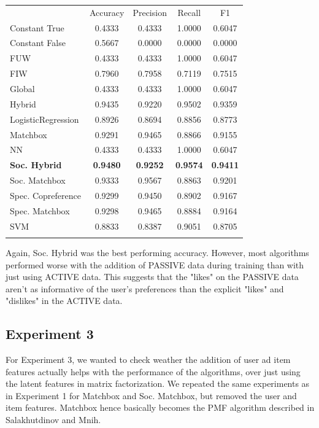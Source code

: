 \begin{table}
\begin{tabular}{ l  c  c  c  c }
\hline\noalign{\smallskip}
 & Accuracy & Precision & Recall & F1 \\
  \noalign{\smallskip}\hline\noalign{\smallskip}
 Constant True & 0.4333  & 0.4333 & 1.0000 & 0.6047 \\
 Constant False & 0.5667 & 0.0000 & 0.0000 & 0.0000 \\
FUW &  0.4333 & 0.4333  & 1.0000 & 0.6047 \\
FIW & 0.7960  & 0.7958 & 0.7119  & 0.7515  \\
Global & 0.4333  & 0.4333  & 1.0000 & 0.6047 \\
Hybrid & 0.9435 & 0.9220  & 0.9502 & 0.9359 \\
LogisticRegression & 0.8926 & 0.8694 & 0.8856 & 0.8773 \\
Matchbox & 0.9291  & 0.9465 & 0.8866  & 0.9155 \\
NN & 0.4333 & 0.4333  & 1.0000 & 0.6047 \\
{\bf Soc. Hybrid} & {\bf 0.9480} & {\bf 0.9252}  & {\bf 0.9574}  & {\bf 0.9411} \\
Soc. Matchbox & 0.9333 & 0.9567  & 0.8863  & 0.9201 \\
Spec. Copreference & 0.9299 & 0.9450 & 0.8902  & 0.9167  \\
Spec. Matchbox & 0.9298 & 0.9465  & 0.8884  & 0.9164 \\
SVM & 0.8833 & 0.8387 & 0.9051 & 0.8705  \\
\noalign{\smallskip}\hline
 \end{tabular} 
\end{table}

Again, Soc. Hybrid was the best performing accuracy. However, most algorithms performed worse with the addition of PASSIVE data during training than with just using ACTIVE data. This suggests that the "likes" on the PASSIVE data aren't as informative of the user's preferences than the explicit "likes" and "dislikes" in the ACTIVE data.

\subsection{Experiment 3}
\label{sec:2}

For Experiment 3,  we wanted to check weather the addition of user ad item features actually helps with the performance of the algorithms, over just using the latent features in matrix factorization. We repeated the same experiments as in Experiment 1 for Matchbox and Soc. Matchbox, but removed the user and item features. Matchbox hence basically becomes the PMF algorithm described in Salakhutdinov and Mnih.

